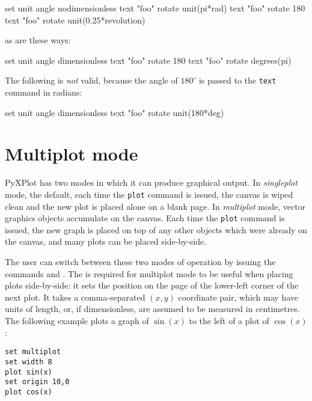 \begin{dodo}
set unit angle nodimensionless\newline
text "foo" rotate unit(pi*rad)\newline
text "foo" rotate 180\newline
text "foo" rotate unit(0.25*revolution)
\end{dodo}

\noindent as are these ways:

\begin{dodo}
set unit angle dimensionless\newline
text "foo" rotate 180\newline
text "foo" rotate degrees(pi)
\end{dodo}

\noindent The following is {\it not} valid, because the angle of $180^\circ$ is
passed to the {\tt text} command in radians:

\begin{dontdo}
set unit angle dimensionless\newline
text "foo" rotate unit(180*deg)
\end{dontdo}

\section{Multiplot mode}
\label{sec:multiplot}

PyXPlot has two modes in which it can produce graphical output. In {\it
singleplot} mode, the default, each time the {\tt plot} command is issued, the
canvas is wiped clean and the new plot is placed alone on a blank page. In {\it
multiplot} mode, vector graphics objects accumulate on the canvas. Each time
the {\tt plot} command is issued, the new graph is placed on top of any other
objects which were already on the canvas, and many plots can be placed
side-by-side.

The user can switch between these two modes of operation by issuing the
commands  and . The
 is required for multiplot mode to be useful when placing
plots side-by-side: it sets the position on the page of the lower-left corner
of the next plot. It takes a comma-separated $(x,y)$ coordinate pair, which may
have units of length, or, if dimensionless, are assumed to be measured in
centimetres. The following example plots a graph of $\sin(x)$ to the left of a
plot of $\cos(x)$:
\begin{verbatim}
set multiplot
set width 8
plot sin(x)
set origin 10,0
plot cos(x)
\end{verbatim}

